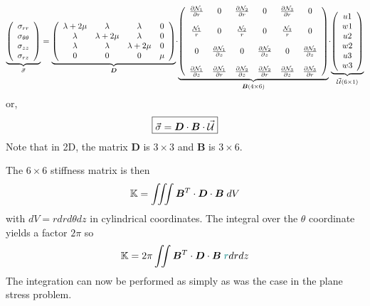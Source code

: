\[
\underbrace{
\left(
\begin{array}{c}
\sigma_{rr} \\
\sigma_{\theta\theta} \\
\sigma_{zz} \\
\sigma_{rz} 
\end{array}
\right)
}_{\vec{\sigma}}
=
\underbrace{
\left(
\begin{array}{cccc}
\lambda+2\mu & \lambda & \lambda & 0  \\
\lambda & \lambda+2\mu & \lambda & 0  \\
\lambda & \lambda & \lambda+2\mu & 0  \\
0 & 0 & 0 & \mu 
\end{array}
\right)
}_{\bm D}
\!
\cdot
\!
\underbrace{
\left(
\begin{array}{ccccccccc}
\frac{\partial {\mathcal{N}}_1}{\partial r} &  0 &  
\frac{\partial {\mathcal{N}}_2}{\partial r} &  0 &
\frac{\partial {\mathcal{N}}_3}{\partial r} &  0 \\  \\
\frac{{\mathcal{N}}_1}{r}  & 0 &  
\frac{{\mathcal{N}}_2}{r}  & 0 &
\frac{{\mathcal{N}}_3}{r}  & 0 \\  \\
 0 & \frac{\partial {\mathcal{N}}_1}{\partial z}  &
 0 & \frac{\partial {\mathcal{N}}_2}{\partial z}  &
 0 & \frac{\partial {\mathcal{N}}_3}{\partial z}  \\ \\
\frac{\partial {\mathcal{N}}_1}{\partial z} & \frac{\partial {\mathcal{N}}_1}{\partial r}  &
\frac{\partial {\mathcal{N}}_2}{\partial z} & \frac{\partial {\mathcal{N}}_2}{\partial r}  &
\frac{\partial {\mathcal{N}}_3}{\partial z} & \frac{\partial {\mathcal{N}}_3}{\partial r}   
\end{array}
\right)
}_{\bm B (4\times 6) }
\!
\cdot
\!
\underbrace{
\left(
\begin{array}{c}
u1 \\  w1 \\ u2 \\  w2 \\ u3 \\ w3 
\end{array}
\right)
}_{\vec {\cal U} (6\times1)}
\]
or, 
\[
\boxed{
\vec\sigma = {\bm D} \cdot {\bm B} \cdot \vec{\cal U}
}
\]
Note that in 2D, the matrix ${\bm D}$ is $3\times3$ and 
${\bm B}$ is $3\times 6$.


\noindent The $6\times 6$ stiffness matrix is then 
\[
{\mathbb{K}} = \iiint {\bm B}^T \cdot {\bm D} \cdot {\bm B}\; dV
\]
with $dV= r dr d\theta dz$ in cylindrical coordinates. The integral 
over the $\theta$ coordinate yields a factor $2\pi$ so 
\[
{\mathbb{K}} = 2 \pi \iint {\bm B}^T \cdot {\bm D} \cdot {\bm B}\; {\color{teal} r} drdz
\]
The integration can now be performed as simply as was the case in the plane stress problem.

